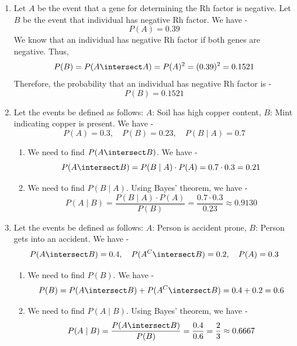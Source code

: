 \begin{enumerate}
\begin{enumerate}
        \[P(B \mid A) = \frac{P(A \intersect B)}{P(A)} = \frac{P(C)}{P(A)} = \frac{0.01}{0.05} = 0.2
        \]
        \item We need to find $P(A \mid B)$. We have -
        \[P(A \mid B) = \frac{P(A \intersect B)}{P(B)} = \frac{P(C)}{P(B)} = \frac{0.01}{0.8} = 0.0125
        \]
        \item We need to find $P(A \intersect B^C)$. We have -
        \[P(A \intersect B^C) = P(A) - P(A \intersect B) = P(A) - P(C) = 0.05 - 0.01 = 0.04
        \]
        \item We need to find $P(A \union B)$. Using inclusion-exclusion, we have -
        \[P(A \union B) = P(A) + P(B) - P(A \intersect B) = P(A) + P(B) - P(C) = 0.05 + 0.8 - 0.01 = 0.84
        \]
    \end{enumerate}
    \item Let $A$ be the event that a gene for determining the Rh factor is negative. Let $B$ be the event that individual has negative Rh factor. We have - 
    $$P(A) = 0.39$$
    We know that an individual has negative Rh factor if both genes are negative. Thus,
    \[P(B) = P(A \intersect A) = P(A)^2 = (0.39)^2 = 0.1521
    \]
    Therefore, the probability that an individual has negative Rh factor is -
    \[\boxed{P(B) = 0.1521}
    \]
    \item Let the events be defined as follows:
    $A$: Soil has high copper content, $B$: Mint indicating copper is present. We have - 
    $$P(A) = 0.3, \quad P(B) = 0.23, \quad P(B \mid A) = 0.7$$
    \begin{enumerate}
        \item We need to find $P(A \intersect B)$. We have -
        \[P(A \intersect B) = P(B \mid A) \cdot P(A) = 0.7 \cdot 0.3 = 0.21
        \]
        \item We need to find $P(B \mid A)$. Using Bayes' theorem, we have -
        \[P(A \mid B) = \frac{P(B \mid A) \cdot P(A)}{P(B)} = \frac{0.7 \cdot 0.3}{0.23} \approx 0.9130
        \]
    \end{enumerate}
    \item Let the events be defined as follows:
    $A$: Person is accident prone, $B$: Person gets into an accident. We have -
    $$P(A \intersect B) = 0.4, \quad P(A^C \intersect B) = 0.2, \quad P(A) = 0.3$$
    \begin{enumerate}
        \item We need to find $P(B)$. We have - 
        $$P(B) = P(A \intersect B) + P(A^C \intersect B) = 0.4 + 0.2 = 0.6$$
        \item We need to find $P(A \mid B)$. Using Bayes' theorem, we have -
        \[P(A \mid B) = \frac{P(A \intersect B)}{P(B)} = \frac{0.4}{0.6} = \frac{2}{3} \approx 0.6667
        \]
    \end{enumerate}
\end{enumerate}
